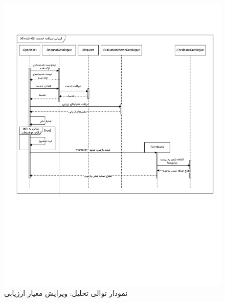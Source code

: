 \begin{figure}[ht!]
	\centering
	\includegraphics[scale=0.8, page=4]{figs/OOD-Sequence-3.pdf}
	\caption{نمودار توالی تحلیل: ویرایش معیار ارزیابی}
\end{figure}
\FloatBarrier
\newpage

